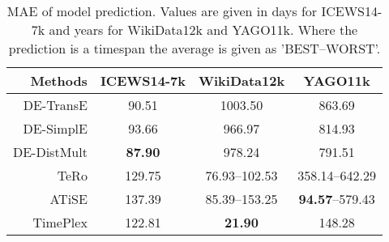 \begin{table}[htb]
\centering
\begin{minipage}{0.95\columnwidth}
\centering

\caption{MAE of model prediction. Values are given in days for ICEWS14-7k and years for WikiData12k and YAGO11k. Where the prediction is a timespan the average is given as '\textsc{BEST}–\textsc{WORST}'.}
\vspace{-3mm}

\begin{tabular}{r|ccc}
\hline
Methods & ICEWS14-7k & WikiData12k & YAGO11k\\
\hline
DE-TransE & 90.51 & 1003.50 & 863.69\\
DE-SimplE & 93.66 & 966.97 & 814.93\\
DE-DistMult & \textbf{87.90} & 978.24 & 791.51\\
TeRo & 129.75 & 76.93–102.53 & 358.14–642.29\\
ATiSE & 137.39 & 85.39–153.25 & \textbf{94.57}–579.43\\
TimePlex & 122.81 & \textbf{21.90} & 148.28\\
\hline
\end{tabular}


\label{tab:time_prediction_mae}
\end{minipage}
\end{table}